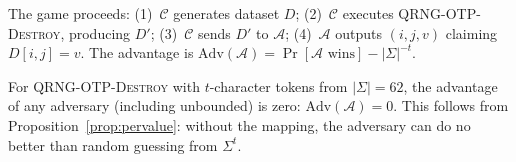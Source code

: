 \documentclass[acmsmall,screen,review,anonymous]{acmart}
\begin{document}
\begin{definition}
\label{def:anon-game}
The game proceeds: (1)~$\mathcal{C}$ generates dataset $D$; (2)~$\mathcal{C}$ executes \textsc{QRNG-OTP-Destroy}, producing $D'$; (3)~$\mathcal{C}$ sends $D'$ to $\mathcal{A}$; (4)~$\mathcal{A}$ outputs $(i, j, v)$ claiming $D[i,j] = v$. The advantage is $\mathrm{Adv}(\mathcal{A}) = \Pr[\mathcal{A}\text{ wins}] - |\Sigma|^{-t}$.
\end{definition}

For \textsc{QRNG-OTP-Destroy} with $t$-character tokens from $|\Sigma|{=}62$, the advantage of any adversary (including unbounded) is zero: $\mathrm{Adv}(\mathcal{A}) = 0$. This follows from Proposition~\ref{prop:pervalue}: without the mapping, the adversary can do no better than random guessing from $\Sigma^t$.
\end{document}
